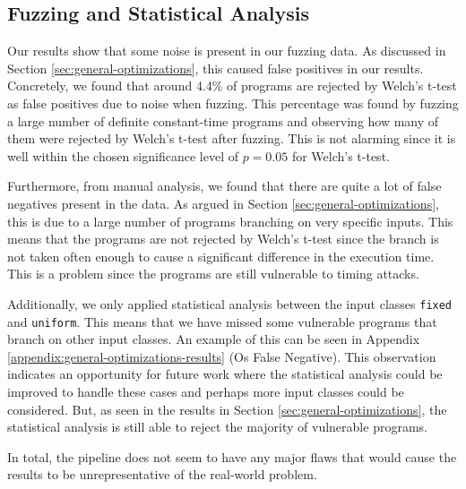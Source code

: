 \subsection{Fuzzing and Statistical Analysis}
Our results show that some noise is present in our fuzzing data.
As discussed in Section \ref{sec:general-optimizations}, this caused false positives in our results.
Concretely, we found that around 4.4\% of programs are rejected by Welch's t-test as false positives due to noise when fuzzing.
This percentage was found by fuzzing a large number of definite constant-time programs and observing how many of them were rejected by Welch's t-test after fuzzing.
This is not alarming since it is well within the chosen significance level of $p = 0.05$ for Welch's t-test.

Furthermore, from manual analysis, we found that there are quite a lot of false negatives present in the data.
As argued in Section \ref{sec:general-optimizations}, this is due to a large number of programs branching on very specific inputs.
This means that the programs are not rejected by Welch's t-test since the branch is not taken often enough to cause a significant difference in the execution time.
This is a problem since the programs are still vulnerable to timing attacks.

Additionally, we only applied statistical analysis between the input classes \texttt{fixed} and \texttt{uniform}.
This means that we have missed some vulnerable programs that branch on other input classes.
An example of this can be seen in Appendix \ref{appendix:general-optimizations-results} (Os False Negative).
This observation indicates an opportunity for future work where the statistical analysis could be improved to handle these cases and perhaps more input classes could be considered.
But, as seen in the results in Section \ref{sec:general-optimizations}, the statistical analysis is still able to reject the majority of vulnerable programs.

In total, the pipeline does not seem to have any major flaws that would cause the results to be unrepresentative of the real-world problem.
